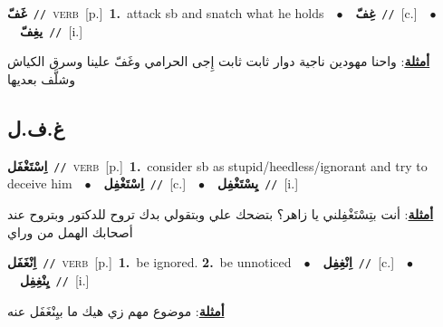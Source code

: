 \documentclass[10pt,a4paper,twoside]{article} %
\begin{document}
\begin{multicols}{2}
{\setlength\topsep{0pt}\textbf{\foreignlanguage{arabic}{غَفّ}}\ {\color{gray}\texttt{//}\color{black}}\ \textsc{verb}\ [p.]\ \textbf{1.}~attack sb and snatch what he holds\ \ $\bullet$\ \ \setlength\topsep{0pt}\textbf{\foreignlanguage{arabic}{غِفّ}}\ {\color{gray}\texttt{//}\color{black}}\ [c.]\ \ $\bullet$\ \ \setlength\topsep{0pt}\textbf{\foreignlanguage{arabic}{يغِفّ}}\ {\color{gray}\texttt{//}\color{black}}\ [i.]\  \begin{flushright}\color{gray}\foreignlanguage{arabic}{\textbf{\underline{\foreignlanguage{arabic}{أمثلة}}}: واحنا مهودين ناجية دوار ثابت ثابت إِجى الحرامي وغَفّ علينا وسرق الكياش وشلَّف بعديها}\end{flushright}\color{black}} \vspace{2mm}

\vspace{-3mm}
\subsection*{\color{blue}\foreignlanguage{arabic}{غ.ف.ل}\color{blue}{}} 

{\setlength\topsep{0pt}\textbf{\foreignlanguage{arabic}{اِسْتَغْفَل}}\ {\color{gray}\texttt{//}\color{black}}\ \textsc{verb}\ [p.]\ \textbf{1.}~consider sb as stupid/heedless/ignorant and try to deceive him\ \ $\bullet$\ \ \setlength\topsep{0pt}\textbf{\foreignlanguage{arabic}{اِسْتَغْفِل}}\ {\color{gray}\texttt{//}\color{black}}\ [c.]\ \ $\bullet$\ \ \setlength\topsep{0pt}\textbf{\foreignlanguage{arabic}{يِسْتَغْفِل}}\ {\color{gray}\texttt{//}\color{black}}\ [i.]\  \begin{flushright}\color{gray}\foreignlanguage{arabic}{\textbf{\underline{\foreignlanguage{arabic}{أمثلة}}}: أنت بتِسْتَغْفِلني يا زاهر؟ بتضحك علي وبتقولي بدك تروح للدكتور وبتروح عند أصحابك الهمل من وراي}\end{flushright}\color{black}} \vspace{2mm}

{\setlength\topsep{0pt}\textbf{\foreignlanguage{arabic}{اِنْغَفَل}}\ {\color{gray}\texttt{//}\color{black}}\ \textsc{verb}\ [p.]\ \textbf{1.}~be ignored.  \textbf{2.}~be unnoticed\ \ $\bullet$\ \ \setlength\topsep{0pt}\textbf{\foreignlanguage{arabic}{اِنْغِفِل}}\ {\color{gray}\texttt{//}\color{black}}\ [c.]\ \ $\bullet$\ \ \setlength\topsep{0pt}\textbf{\foreignlanguage{arabic}{يِنْغِفِل}}\ {\color{gray}\texttt{//}\color{black}}\ [i.]\  \begin{flushright}\color{gray}\foreignlanguage{arabic}{\textbf{\underline{\foreignlanguage{arabic}{أمثلة}}}: موضوع مهم زي هيك ما بيِنْغَفَل عنه}\end{flushright}\color{black}} \vspace{2mm}


\end{multicols}
\end{document}
